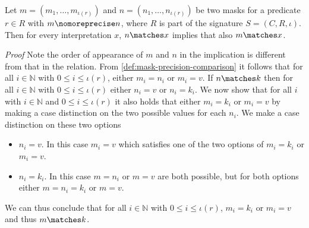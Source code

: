 \begin{lemma}
    \label{lem:mask-precision-lemma}
    Let $m = (m_1, \dots, m_{\iota(r)})$ and $n = (n_1, \dots, n_{\iota(r)})$ be two masks for a predicate $r \in R$ with $m \nomoreprecise n$, where $R$ is part of the signature $S = (C,R,\iota)$.
    Then for every interpretation $x$, $n \matches x$ implies that also $m \matches x$.
\end{lemma}
\textit{Proof} 
Note the order of appearance of $m$ and $n$ in the implication is different from that in the relation.
From \ref{def:mask-precision-comparison} it follows that for all $i \in \mathbb{N}$ with $0 \leq i \leq \iota(r)$, either $m_i = n_i$ or $m_i = v$.
If $n \matches k$ then for all $i \in \mathbb{N}$ with $0 \leq i \leq \iota(r)$ either $n_i = v$ or $n_i = k_i$.
We now show that for all $i$ with $i \in \mathbb{N}$ and $0 \leq i \leq \iota(r)$ it also holds that either $m_i = k_i$ or $m_i = v$ by making a case distinction on the two possible values for each $n_i$.
We make a case distinction on these two options
\begin{itemize}
    \item $n_i = v$. In this case $m_i = v$ which satisfies one of the two options of $m_i = k_i$ or $m_i = v$.
    \item $n_i = k_i$. In this case $m=n_i$ or $m=v$ are both possible, but for both options either $m=n_i=k_i$ or $m=v$.
\end{itemize}
We can thus conclude that for all $i \in \mathbb{N}$ with $0 \leq i \leq \iota(r)$, $m_i = k_i$ or $m_i = v$ and thus $m \matches k$.